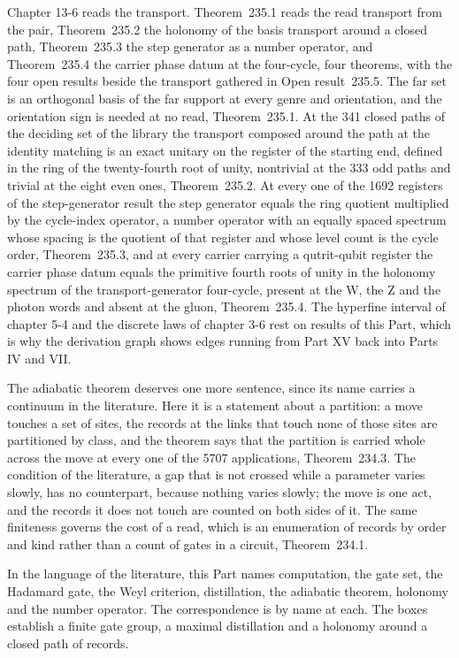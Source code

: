 Chapter 13-6 reads the transport. Theorem~235.1 reads the read transport from the pair, Theorem~235.2 the holonomy of the basis transport around a closed path, Theorem~235.3 the step generator as a number operator, and Theorem~235.4 the carrier phase datum at the four-cycle, four theorems, with the four open results beside the transport gathered in Open result~235.5. The far set is an orthogonal basis of the far support at every genre and orientation, and the orientation sign is needed at no read, Theorem~235.1. At the 341 closed paths of the deciding set of the library the transport composed around the path at the identity matching is an exact unitary on the register of the starting end, defined in the ring of the twenty-fourth root of unity, nontrivial at the 333 odd paths and trivial at the eight even ones, Theorem~235.2. At every one of the 1692 registers of the step-generator result the step generator equals the ring quotient multiplied by the cycle-index operator, a number operator with an equally spaced spectrum whose spacing is the quotient of that register and whose level count is the cycle order, Theorem~235.3, and at every carrier carrying a qutrit-qubit register the carrier phase datum equals the primitive fourth roots of unity in the holonomy spectrum of the transport-generator four-cycle, present at the W, the Z and the photon words and absent at the gluon, Theorem~235.4. The hyperfine interval of chapter 5-4 and the discrete laws of chapter 3-6 rest on results of this Part, which is why the derivation graph shows edges running from Part XV back into Parts IV and VII.

The adiabatic theorem deserves one more sentence, since its name carries a continuum in the literature. Here it is a statement about a partition: a move touches a set of sites, the records at the links that touch none of those sites are partitioned by class, and the theorem says that the partition is carried whole across the move at every one of the 5707 applications, Theorem~234.3. The condition of the literature, a gap that is not crossed while a parameter varies slowly, has no counterpart, because nothing varies slowly; the move is one act, and the records it does not touch are counted on both sides of it. The same finiteness governs the cost of a read, which is an enumeration of records by order and kind rather than a count of gates in a circuit, Theorem~234.1.

In the language of the literature, this Part names computation, the gate set, the Hadamard gate, the Weyl criterion, distillation, the adiabatic theorem, holonomy and the number operator. The correspondence is by name at each. The boxes establish a finite gate group, a maximal distillation and a holonomy around a closed path of records.


